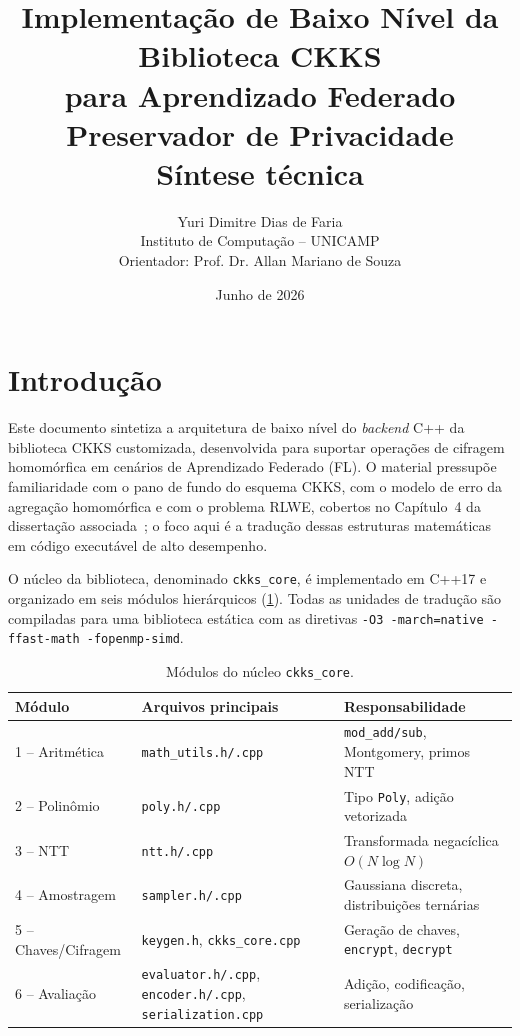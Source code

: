 \documentclass[11pt,a4paper]{article}
\begin{document}
\title{\textbf{Implementação de Baixo Nível da Biblioteca CKKS\\
para Aprendizado Federado Preservador de Privacidade}\\[0.4em]
\large Síntese técnica}
\author{Yuri Dimitre Dias de Faria\\
\small Instituto de Computação -- UNICAMP\\
\small Orientador: Prof. Dr. Allan Mariano de Souza}
\date{Junho de 2026}
\maketitle

\section{Introdução}
\label{sec:intro}

Este documento sintetiza a arquitetura de baixo nível do \emph{backend} C++ da
biblioteca CKKS customizada, desenvolvida para suportar operações de cifragem
homomórfica em cenários de Aprendizado Federado (FL). O material pressupõe
familiaridade com o pano de fundo do esquema CKKS, com o modelo de erro da
agregação homomórfica e com o problema RLWE, cobertos no Capítulo~4 da dissertação
associada~\cite{Cheon2017,sealmanual}; o foco aqui é a tradução dessas estruturas
matemáticas em código executável de alto desempenho.

O núcleo da biblioteca, denominado \texttt{ckks\_core}, é implementado em C++17 e
organizado em seis módulos hierárquicos (\cref{tab:modulos}). Todas as unidades de
tradução são compiladas para uma biblioteca estática com as diretivas
\texttt{-O3 -march=native -ffast-math -fopenmp-simd}.

\begin{table}[ht]
\centering
\caption{Módulos do núcleo \texttt{ckks\_core}.}
\label{tab:modulos}
\small
\begin{tabular}{lll}
\toprule
\textbf{Módulo} & \textbf{Arquivos principais} & \textbf{Responsabilidade} \\
\midrule
1 – Aritmética & \texttt{math\_utils.h/.cpp} & \texttt{mod\_add/sub}, Montgomery, primos NTT \\
2 – Polinômio  & \texttt{poly.h/.cpp}        & Tipo \texttt{Poly}, adição vetorizada \\
3 – NTT        & \texttt{ntt.h/.cpp}         & Transformada negacíclica $O(N\log N)$ \\
4 – Amostragem & \texttt{sampler.h/.cpp}     & Gaussiana discreta, distribuições ternárias \\
5 – Chaves/Cifragem & \texttt{keygen.h}, \texttt{ckks\_core.cpp} & Geração de chaves, \texttt{encrypt}, \texttt{decrypt} \\
6 – Avaliação  & \texttt{evaluator.h/.cpp}, \texttt{encoder.h/.cpp}, \texttt{serialization.cpp} & Adição, codificação, serialização \\
\bottomrule
\end{tabular}
\end{table}
\end{document}
